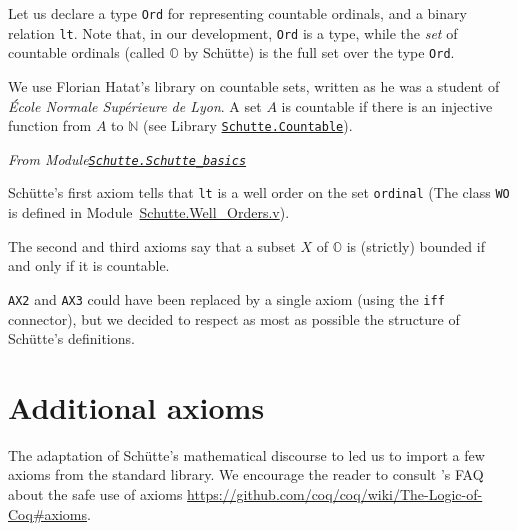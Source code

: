 Let us declare a type 
\texttt{Ord} for representing countable ordinals, and a binary relation
 \texttt{lt}. Note that, in our development, \texttt{Ord} is a type, while the \emph{set} of countable ordinals (called $\mathbb{O}$ by Schütte) 
is the full set over the type \texttt{Ord}.

\label{types:Ord} 

We use Florian Hatat's library on countable sets, written as he was a student of  \emph{\'Ecole Normale Supérieure de Lyon}. A set $A$ is countable if there is an injective function from $A$ to $\mathbb{N}$ (see 
Library \href{../theories/html/hydras.Schutte.Countable.html}%
{\texttt{Schutte.Countable}}).


\vspace{6pt}

\emph{From Module\href{../theories/html/hydras.Schutte.Schutte_basics.html}%
{\texttt{Schutte.Schutte\_basics}}}





Schütte's first axiom tells that \texttt{lt} is a well order on the set 
\texttt{ordinal} (The  class \texttt{WO} is defined in
Module~\href{../theories/html/hydras.Schutte.Well_Orders.html}{Schutte.Well\_Orders.v}).


\label{types:WO}







The second and third axioms say that a subset $X$ of $\mathbb{O}$ is
(strictly) bounded if and only if it is countable. 




\texttt{AX2} and \texttt{AX3} could have been replaced by a single axiom (using the \texttt{iff} connector), but we decided to respect as most as possible the structure of Schütte's definitions.

\section{Additional  axioms}

The adaptation of Schütte's mathematical discourse to \coq{} led us to
import a few axioms from the standard library. We encourage the reader to consult \coq{}'s FAQ about the safe use of axioms
 \url{https://github.com/coq/coq/wiki/The-Logic-of-Coq#axioms}.

